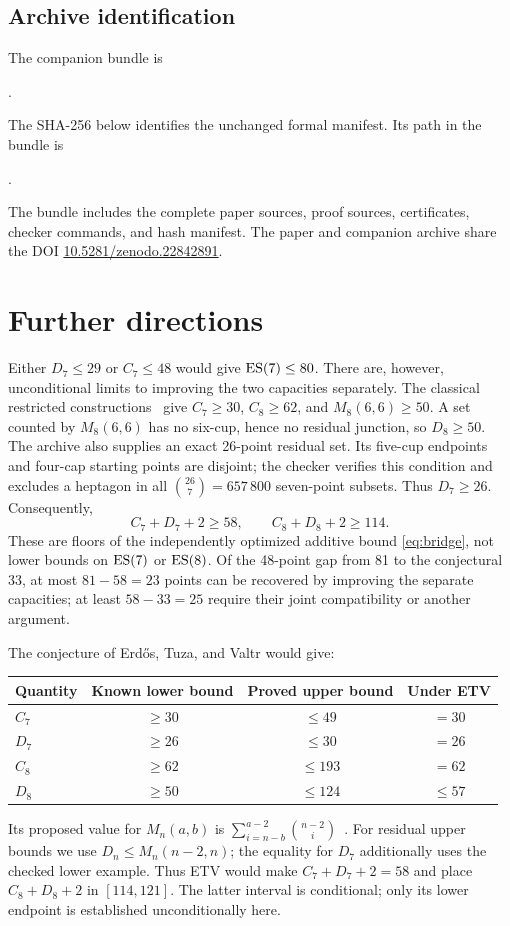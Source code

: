 \subsection{Archive identification}
The companion bundle is
\begin{center}.\end{center}
The SHA-256 below identifies the unchanged formal manifest.
Its path in the bundle is
\begin{center}.\end{center}
\begin{center}\small\ttfamily

\end{center}
The bundle includes the complete paper sources, proof sources,
certificates, checker commands, and hash manifest. The paper and companion archive share the DOI
\href{https://doi.org/10.5281/zenodo.22842891}{10.5281/zenodo.22842891}.

\section{Further directions}
Either $D_7\le29$ or $C_7\le48$ would give $\operatorname{ES}(7)\le80$.
There are, however, unconditional limits to improving the two capacities
separately. The classical restricted constructions~\cite{ES61,ETV} give
$C_7\ge30$, $C_8\ge62$, and $M_8(6,6)\ge50$. A set counted by
$M_8(6,6)$ has no six-cup, hence no residual junction, so $D_8\ge50$.
The archive also supplies an exact 26-point residual set. Its five-cup
endpoints and four-cap starting points are disjoint; the checker verifies
this condition and excludes a heptagon in all
$\binom{26}{7}=657\,800$ seven-point subsets. Thus $D_7\ge26$.
Consequently,
\[
 C_7+D_7+2\ge58,\qquad C_8+D_8+2\ge114.
\]
These are floors of the independently optimized additive bound
\eqref{eq:bridge}, not lower bounds on $\operatorname{ES}(7)$ or $\operatorname{ES}(8)$.
Of the 48-point gap from 81 to the conjectural 33, at most
$81-58=23$ points can be recovered by improving the separate capacities;
at least $58-33=25$ require their joint compatibility or another argument.

The conjecture of Erd\H{o}s, Tuza, and Valtr would give:
\begin{center}
\begin{tabular}{lccc}
\toprule
Quantity & Known lower bound & Proved upper bound & Under ETV\\
\midrule
$C_7$ & $\ge30$ & $\le49$ & $=30$\\
$D_7$ & $\ge26$ & $\le30$ & $=26$\\
$C_8$ & $\ge62$ & $\le193$ & $=62$\\
$D_8$ & $\ge50$ & $\le124$ & $\le57$\\
\bottomrule
\end{tabular}
\end{center}
Its proposed value for $M_n(a,b)$ is
$\sum_{i=n-b}^{a-2}\binom{n-2}{i}$~\cite{ETV,Baek}.
For residual upper bounds we use $D_n\le M_n(n-2,n)$;
the equality for $D_7$ additionally uses the checked lower example.
Thus ETV would make $C_7+D_7+2=58$ and place
$C_8+D_8+2$ in $[114,121]$. The latter interval is conditional;
only its lower endpoint is established unconditionally here.

